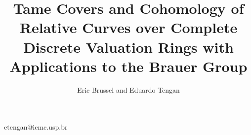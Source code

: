 \documentclass{amsart}
\theoremstyle{plain}
\theoremstyle{definition}
\theoremstyle{remark}
\numberwithin{equation}{section}%
\begin{document}


\title[Tame Covers and Cohomology of Relative Curves]
{Tame Covers and Cohomology of Relative Curves
over Complete Discrete Valuation Rings
with Applications to the Brauer Group
}


\author{Eric Brussel and Eduardo Tengan}
\address 
{Department of Mathematics \& Computer Science\\
Emory University\\
Atlanta, GA 30322\\ USA}
\address
{Instituto de Ci\^encias Matem\'aticas e de Computa\c c\~ao\\
Universidade de S\~ao Paulo\\
S\~ao Carlos, S\~ao Paulo\\ Brazil}
\email
{etengan@icmc.usp.br}





\end{document}
